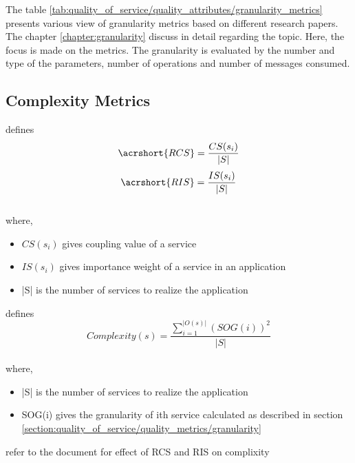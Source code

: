 {{{\begin{itemize}[leftmargin=.5in]
{The table \ref{tab:quality_of_service/quality_attributes/granularity_metrics} presents various view of granularity metrics based on different research papers. The chapter \ref{chapter:granularity} discuss in detail regarding the topic. Here, the focus is made on the metrics. The granularity is evaluated by the number and type of the parameters, number of operations and number of messages consumed.


\subsection{Complexity Metrics}{\label{section:quality_of_service/quality_metrics/complexity}

\cite{Zhang:2009aa} defines
$$ \acrshort{RCS} = \frac{CS(s_i)}{|S|}$$
$$ \acrshort{RIS} = \frac{IS(s_i)}{|S|}$$
\\
where,
\\
\begin{itemize}[leftmargin=.5in]
\item $CS(s_i)$ gives coupling value of a service
\item $IS(s_i)$ gives importance weight of a service in an application
\item |S| is the number of services to realize the application
\end{itemize}

\cite{Saad-Alahmari:2011aa} defines
$$ Complexity(s) = \frac{\sum_{i=1}^{|O(s)|}(SOG(i))^2}{|S|}$$
\\
where,
\\
\begin{itemize}[leftmargin=.5in]
\item |S| is the number of services to realize the application
\item SOG(i) gives the granularity of ith service calculated as described in section \ref{section:quality_of_service/quality_metrics/granularity}
\end{itemize}

refer to the document for effect of RCS and RIS on complixity

}}
\end{itemize}}}}
